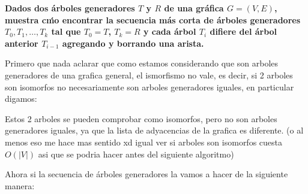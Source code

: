 \textbf{Dados dos \'arboles generadores $T$ y $R$ de una gr\'afica $G = (V, E)$, muestra c\'mo encontrar la secuencia m\'as corta de \'arboles generadores $T_0, T_1, \dots, T_k$ tal que $T_0 = T$, $T_k = R$ y cada \'arbol $T_i$ difiere del \'arbol anterior $T_{i-1}$ agregando y borrando una arista.}\vspace{.2cm}

Primero que nada aclarar que como estamos considerando que son arboles generadores de una grafica general, el ismorfismo no vale, es decir, si 2 arboles son isomorfos no necesariamente son arboles generadores iguales, en particular digamos: \vspace{.2cm}

\begin{center}
    \begin{figure}[H]
        \centering
        
        \label{fig:arbolesIso}
    \end{figure}
\end{center}

Estos 2 arboles se pueden comprobar como isomorfos, pero no son arboles generadores iguales, ya que la lista de adyacencias de la grafica es diferente. (o al menos eso me hace mas sentido xd igual ver si arboles son isomorfos cuesta $O(|V|)$ asi que se podria hacer antes del siguiente algoritmo) \vspace{.2cm}

Ahora si la secuencia de \'arboles generadores la vamos a hacer de la siguiente manera: \vspace{.2cm}

